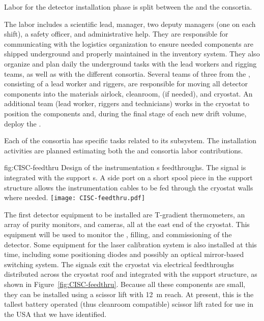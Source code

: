 Labor for the detector installation phase is split between %
the  and the  consortia. 

The  labor includes a scientific lead, manager, two deputy managers (one on each shift), a safety officer, and administrative help. They are responsible for communicating with the  logistics organization %
to ensure needed components are shipped underground and properly maintained in the inventory system.  They also organize and plan daily the underground tasks with the lead workers and rigging teams, as well as with the different consortia.  Several teams of three  from the , consisting of a lead worker and riggers, are responsible for moving all detector components into the materials airlock,  cleanroom, \coldbox (if needed), and cryostat. An additional team (lead worker, riggers and technicians) works in the cryostat to position the  components and, during the final stage of each new drift volume,  deploy the . 

Each of the   consortia has %
specific tasks related to its subsystem. 
The installation activities are planned estimating both the  and consortia labor contributions.

\begin{dunefigure}{fig:CISC-feedthru}
{Design of the instrumentation \fdth{}s feedthroughs. The signal \fdth is integrated with the  support \fdth{}s. A side port on a short spool piece in the  support structure allows the instrumentation cables to be fed through the cryostat walls where needed.}
\texttt{[image: CISC-feedthru.pdf]}
\end{dunefigure}




The first detector equipment to be installed are  T-gradient thermometers,  an array of purity monitors, and cameras, all at the east end of the cryostat. This equipment will be used to monitor the \cooldown, filling, and commissioning of the detector. Some equipment for the laser calibration system is also installed at this time, including some positioning diodes and possibly an optical mirror-based switching system.  The signals exit the cryostat via electrical feedthroughs distributed across the cryostat roof and integrated with the  support structure, as shown in Figure~\ref{fig:CISC-feedthru}. Because all these components are small, they can be installed using a scissor lift with \SI{12}{m} reach. At present, this is the tallest battery operated (thus cleanroom compatible) scissor lift rated for use in the USA that we have identified.



